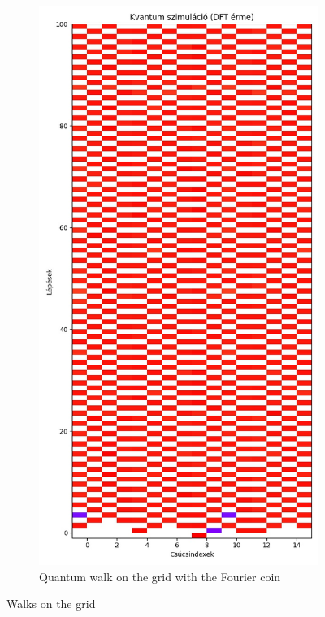 \begin{figure}[H]
\begin{subfigure}{.45\linewidth}
  \end{subfigure}
  \begin{subfigure}{.45\linewidth}
    \centering
    \includegraphics[width=\linewidth]{./figures/results/grid/dft.jpg}
    \caption{Quantum walk on the grid with the Fourier coin}
  \end{subfigure}
  \caption{Walks on the grid}
  \label{fig:all}
\end{figure}


